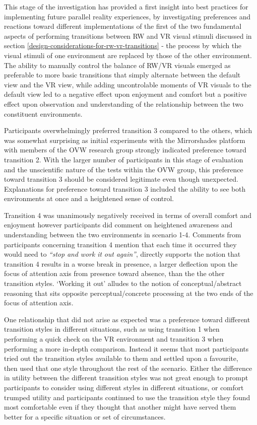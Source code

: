 This stage of the investigation has provided a first insight into best practices for implementing future parallel reality experiences, by investigating preferences and reactions toward different implementations of the first of the two fundamental aspects of performing transitions between RW and VR visual stimuli discussed in section \ref{design-considerations-for-rw-vr-transitions} - the process by which the visual stimuli of one environment are replaced by those of the other environment. The ability to manually control the balance of RW/VR visuals emerged as preferable to more basic transitions that simply alternate between the default view and the VR view, while adding uncontrolable moments of VR visuals to the default view led to a negative effect upon enjoyment and comfort but a positive effect upon observation and understanding of the relationship between the two constituent environments.

Participants overwhelmingly preferred transition 3 compared to the others, which was somewhat surprising as initial experiments with the Mirrorshades platform with members of the OVW research group strongly indicated preference toward transition 2. With the larger number of participants in this stage of evaluation and the unscientific nature of the tests within the OVW group, this preference toward transition 3 should be considered legitimate even though unexpected. Explanations for preference toward transition 3 included the ability to see both environments at once and a heightened sense of control.

Transition 4 was unanimously negatively received in terms of overall comfort and enjoyment however participants did comment on heightened awareness and understanding between the two environments in scenario 1-4. Comments from participants concerning transition 4 mention that each time it occurred they would need to \textit{``stop and work it out again''}, directly supports the notion that transition 4 results in a worse break in presence, a larger deflection upon the focus of attention axis from presence toward absence, than the the other transition styles. `Working it out' alludes to the notion of conceptual/abstract reasoning that sits opposite perceptual/concrete processing at the two ends of the focus of attention axis.

One relationship that did not arise as expected was a preference toward different transition styles in different situations, such as using transition 1 when performing a quick check on the VR environment and transition 3 when performing a more in-depth comparison. Instead it seems that most participants tried out the transition styles available to them and settled upon a favourite, then used that one style throughout the rest of the scenario. Either the difference in utility between the different transition styles was not great enough to prompt participants to consider using different styles in different situations, or comfort trumped utility and participants continued to use the transition style they found most comfortable even if they thought that another might have served them better for a specific situation or set of circumstances.

